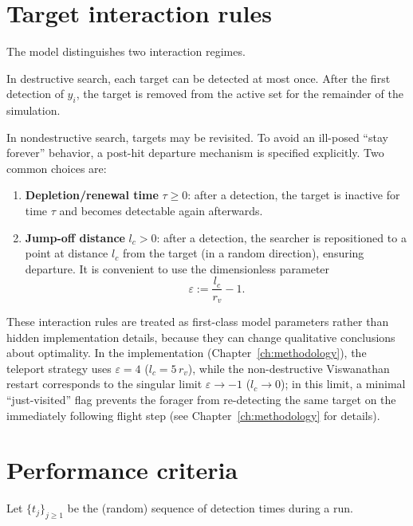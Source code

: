 \section{Target interaction rules}
The model distinguishes two interaction regimes.

\begin{Def}
In destructive search, each target can be detected at most once. After the first detection of $y_i$, the target is removed from the active set for the remainder of the simulation.
\end{Def}

\begin{Def}
In nondestructive search, targets may be revisited. To avoid an ill-posed “stay forever” behavior, a post-hit departure mechanism is specified explicitly. Two common choices are:
\begin{enumerate}
    \item \textbf{Depletion/renewal time} $\tau \ge 0$: after a detection, the target is inactive for time $\tau$ and becomes detectable again afterwards.
    \item \textbf{Jump-off distance} $l_c>0$: after a detection, the searcher is repositioned to a point at distance $l_c$ from the target (in a random direction), ensuring departure. It is convenient to use the dimensionless parameter
    \begin{equation}
        \varepsilon := \frac{l_c}{r_v}-1 .
        \label{eq:epsilon_jumpoff}
    \end{equation}
\end{enumerate}
\end{Def}

These interaction rules are treated as first-class model parameters
rather than hidden implementation details, because they can change
qualitative conclusions about optimality.  In the implementation
(Chapter~\ref{ch:methodology}), the teleport strategy uses
$\varepsilon = 4$ ($l_c = 5\,r_v$), while the non-destructive
Viswanathan restart corresponds to the singular limit
$\varepsilon \to -1$ ($l_c \to 0$); in this limit, a minimal
``just-visited'' flag prevents the forager from re-detecting
the same target on the immediately following flight step
(see Chapter~\ref{ch:methodology} for details).

\section{Performance criteria}
Let $\{t_j\}_{j\ge 1}$ be the (random) sequence of detection times during a run.

